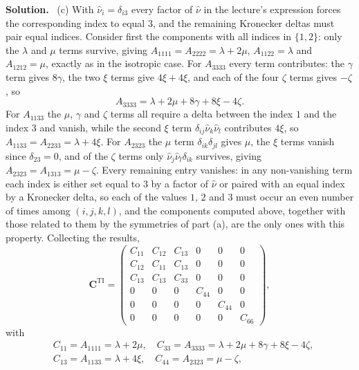 \documentclass[a4paper,12pt]{paper}
\newenvironment{solution}{\par\noindent\textbf{Solution.}\ }{\par\medskip}
\begin{document}
\begin{solution}
(c) With $\hat{\nu}_{i}=\delta_{i3}$ every factor of $\hat{\nu}$ in the lecture's expression
forces the corresponding index to equal $3$, and the remaining Kronecker deltas must pair equal
indices. Consider first the components with all indices in $\{1,2\}$: only the $\lambda$ and $\mu$
terms survive, giving $A_{1111}=A_{2222}=\lambda+2\mu$, $A_{1122}=\lambda$ and $A_{1212}=\mu$, exactly
as in the isotropic case. For $A_{3333}$ every term contributes: the $\gamma$ term gives $8\gamma$,
the two $\xi$ terms give $4\xi+4\xi$, and each of the four $\zeta$ terms gives $-\zeta$, so
\begin{equation}
A_{3333}=\lambda+2\mu+8\gamma+8\xi-4\zeta.
\label{eq:28}
\end{equation}
For $A_{1133}$ the $\mu$, $\gamma$ and $\zeta$ terms all require a delta between the index $1$ and the
index $3$ and vanish, while the second $\xi$ term $\delta_{ij}\hat{\nu}_{k}\hat{\nu}_{l}$ contributes
$4\xi$, so $A_{1133}=A_{2233}=\lambda+4\xi$. For $A_{2323}$ the $\mu$ term $\delta_{ik}\delta_{jl}$
gives $\mu$, the $\xi$ terms vanish since $\delta_{23}=0$, and of the $\zeta$ terms only
$\hat{\nu}_{j}\hat{\nu}_{l}\delta_{ik}$ survives, giving $A_{2323}=A_{1313}=\mu-\zeta$. Every remaining
entry vanishes: in any non-vanishing term each index is either set equal to $3$ by a factor of
$\hat{\nu}$ or paired with an equal index by a Kronecker delta, so each of the values $1$, $2$ and $3$
must occur an even number of times among $(i,j,k,l)$, and the components computed above, together
with those related to them by the symmetries of part (a), are the only ones with this property.
Collecting the results,
\begin{equation}
\mathbf{C}^{\mathrm{TI}}=\begin{pmatrix}
C_{11} & C_{12} & C_{13} & 0 & 0 & 0\\
C_{12} & C_{11} & C_{13} & 0 & 0 & 0\\
C_{13} & C_{13} & C_{33} & 0 & 0 & 0\\
0 & 0 & 0 & C_{44} & 0 & 0\\
0 & 0 & 0 & 0 & C_{44} & 0\\
0 & 0 & 0 & 0 & 0 & C_{66}
\end{pmatrix},
\label{eq:29}
\end{equation}
with
\begin{equation}
\begin{split}
&C_{11}=A_{1111}=\lambda+2\mu,\quad C_{33}=A_{3333}=\lambda+2\mu+8\gamma+8\xi-4\zeta,\\
&C_{13}=A_{1133}=\lambda+4\xi,\quad C_{44}=A_{2323}=\mu-\zeta,\\

\end{split}
\end{equation}
\end{solution}
\end{document}

